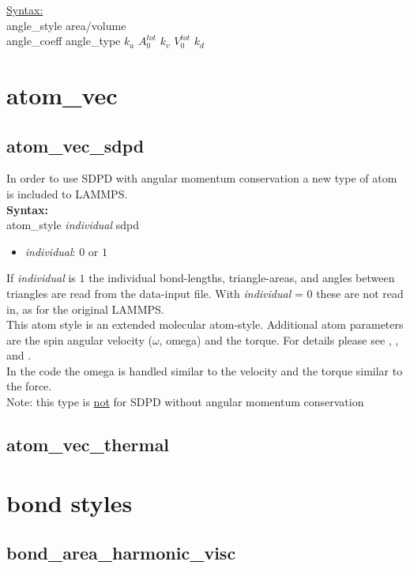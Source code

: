 \documentclass[a4paper,10pt]{scrreprt}
\begin{document}
\underline{Syntax:}\\
angle\_style \quad area/volume \\
angle\_coeff \quad angle\_type $k_a$  $A_0^{tot}$ $k_v$ $V_0^{tot}$ $k_d$


\section{atom\_vec}


\subsection{atom\_vec\_sdpd}

In order to use SDPD with angular momentum conservation a new type of atom is included to LAMMPS.
\\[2ex]
{\bfseries Syntax:}\\
atom\_style    \textit{individual} sdpd
\begin{itemize}
\item \textit{individual}: $0$ or $1$
\end{itemize}

If \textit{individual} is $1$ the individual bond-lengths, triangle-areas, and angles between triangles are read from the data-input file.
With \textit {individual} = $0$ these are not read in, as for the original LAMMPS.
\\[2ex]
This atom style is an extended molecular atom-style.
Additional atom parameters are the spin angular velocity ($\omega$, omega) and the torque.
For details please see , , and .
\\[2ex]
In the code the omega is handled similar to the velocity and the torque similar to the force.
\\[2ex]
Note: this type is \underline{not} for SDPD without angular momentum conservation

\subsection{atom\_vec\_thermal}

\section{bond styles}

\subsection{bond\_area\_harmonic\_visc}
\end{document}
